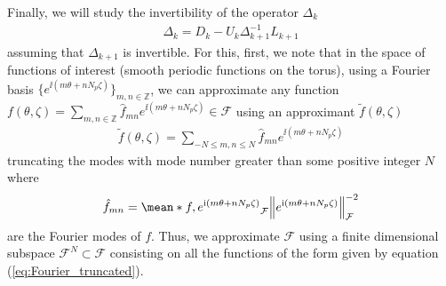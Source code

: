 Finally, we will study the invertibility of the operator $\Delta_k$ 
%
\begin{align}
	\Delta_{k} = D_k - U_k \Delta_{k+1}^{-1} L_{k+1} 
\label{eq:Invertibility_Delta}
\end{align}
assuming that $\Delta_{k+1}$ is invertible. For this, first, we note that in the space of functions of interest (smooth periodic functions on the torus), using a Fourier basis $\{e^{\ii (m \theta+ nN_p\zeta)}\}_{m,n\in\mathbb{Z}}$, we can approximate any function $f(\theta,\zeta)=\sum_{m,n\in \mathbb{Z}} \hat{f}_{mn} e^{\ii (m \theta+ nN_p\zeta)} \in \mathcal{F}$ using an approximant $\tilde{f}(\theta,\zeta)$
%
\begin{align}
	\tilde{f}(\theta,\zeta)=\sum_{- N \le m,n\le N } \hat{f}_{mn} e^{\ii (m \theta+ nN_p\zeta)}
\label{eq:Fourier_truncated}
\end{align}
truncating the modes with mode number greater than some positive integer $N $ where 
\begin{align}
	\hat{f}_{mn} = \mean*{f,e^{\ii (m \theta+ nN_p\zeta)}}_{\mathcal{F}}  \norm{e^{\ii (m \theta+ nN_p\zeta)}}_{\mathcal{F}}^{-2}
\end{align}
 are the Fourier modes of $f$. Thus, we approximate $\mathcal{F}$ using a finite dimensional subspace $\mathcal{F}^{N} \subset \mathcal{F}$ consisting on all the functions of the form given by equation (\ref{eq:Fourier_truncated}).
 
